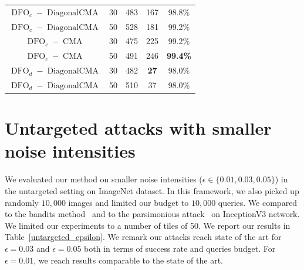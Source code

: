 \begin{subappendices}
\begin{table}[htb]
\begin{center}
\begin{tabular}{cc|cc|c}
\hline

$\operatorname{DFO}_c-\operatorname{DiagonalCMA}$ & 30&	483	&167&	98.8\%\\
$\operatorname{DFO}_c-\operatorname{DiagonalCMA}$  & 50&	528	&181&	99.2\%\\


\hline
$\operatorname{DFO}_c-\operatorname{CMA}$ & 30&	475	&225&	99.2\%\\
$\operatorname{DFO}_c-\operatorname{CMA}$ & 50&	491	&246	&\textbf{99.4\%}\\

\hline
$\operatorname{DFO}_d-\operatorname{DiagonalCMA}$  &30&	482 &	\textbf{27}&	98.0\%\\
$\operatorname{DFO}_d-\operatorname{DiagonalCMA}$  &50&	510& 37	&	98.0\%\\
\end{tabular}
\end{center}
\end{table}



\newpage
\section{Untargeted attacks with smaller noise intensities}
\label{smaller}
We evaluated our method on smaller noise intensities ($\epsilon\in\{0.01,0.03,0.05\}$) in the untargeted setting on ImageNet dataset. In this framework, we also picked up randomly $10,000$ images and limited our budget to $10,000$ queries. We compared to the bandits method~\citep{ilyas2018prior} and to the parsimonious attack~\citep{moon19aparsimonous} on InceptionV3 network. We limited our experiments to a number of tiles of 50. We report our results in Table~\ref{untargeted_epsilon}. We remark our attacks reach state of the art for $\epsilon=0.03$ and $\epsilon=0.05$ both in terms of success rate and queries budget. For $\epsilon=0.01$, we reach results comparable to the state of the art.


\end{subappendices}
